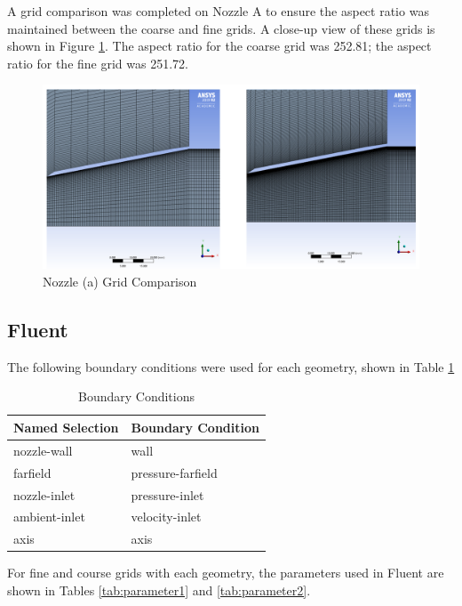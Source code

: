 \documentclass[12pt]{article} %
\begin{document}
A grid comparison was completed on Nozzle A to ensure the aspect ratio was maintained between the coarse and fine grids. A close-up view of these grids is shown in Figure \ref{fig:gridcompareA}. The aspect ratio for the coarse grid was 252.81; the aspect ratio for the fine grid was 251.72.

\begin{figure}[ht]
    \centering
    \includegraphics[width = \linewidth]{GridCompareA.png}
    \caption{Nozzle (a) Grid Comparison}
    \label{fig:gridcompareA}
\end{figure}

\subsection{Fluent}\label{section:fluent}
The following boundary conditions were used for each geometry, shown in Table \ref{tab:boundary}

\begin{table}[ht]
    \caption{Boundary Conditions}
    \centering
    \begin{tabular}{l|l}
        Named Selection&Boundary Condition\\
        \hline
        nozzle-wall&wall\\
        farfield&pressure-farfield\\
        nozzle-inlet&pressure-inlet\\
        ambient-inlet&velocity-inlet\\
        axis&axis\\
        \hline
    \end{tabular}
    \label{tab:boundary}
\end{table}

For fine and course grids with each geometry, the parameters used in Fluent are shown in Tables \ref{tab:parameter1} and \ref{tab:parameter2}. 
\end{document}
